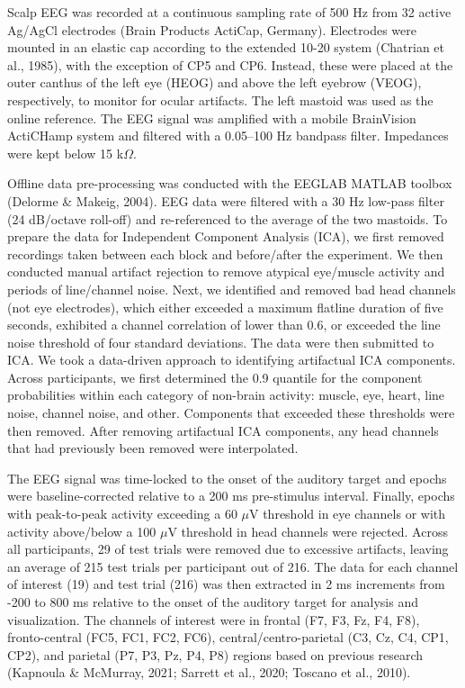 \documentclass[
  12pt,
  twoside]{article}
\begin{document}
Scalp EEG was recorded at a continuous sampling rate of 500 Hz from 32 active Ag/AgCl electrodes (Brain Products ActiCap, Germany).
Electrodes were mounted in an elastic cap according to the extended 10-20 system (Chatrian et al., 1985), with the exception of CP5 and CP6.
Instead, these were placed at the outer canthus of the left eye (HEOG) and above the left eyebrow (VEOG), respectively, to monitor for ocular artifacts.
The left mastoid was used as the online reference.
The EEG signal was amplified with a mobile BrainVision ActiCHamp system and filtered with a 0.05--100 Hz bandpass filter.
Impedances were kept below 15 k\(\Omega\).

Offline data pre-processing was conducted with the EEGLAB MATLAB toolbox (Delorme \& Makeig, 2004).
EEG data were filtered with a 30 Hz low-pass filter (24 dB/octave roll-off) and re-referenced to the average of the two mastoids.
To prepare the data for Independent Component Analysis (ICA), we first removed recordings taken between each block and before/after the experiment.
We then conducted manual artifact rejection to remove atypical eye/muscle activity and periods of line/channel noise.
Next, we identified and removed bad head channels (not eye electrodes), which either exceeded a maximum flatline duration of five seconds, exhibited a channel correlation of lower than 0.6, or exceeded the line noise threshold of four standard deviations.
The data were then submitted to ICA.
We took a data-driven approach to identifying artifactual ICA components.
Across participants, we first determined the 0.9 quantile for the component probabilities within each category of non-brain activity: muscle, eye, heart, line noise, channel noise, and other.
Components that exceeded these thresholds were then removed.
After removing artifactual ICA components, any head channels that had previously been removed were interpolated.

The EEG signal was time-locked to the onset of the auditory target and epochs were baseline-corrected relative to a 200 ms pre-stimulus interval.
Finally, epochs with peak-to-peak activity exceeding a 60 \(\mu\)V threshold in eye channels or with activity above/below a 100 \(\mu\)V threshold in head channels were rejected.
Across all participants, 29 of test trials were removed due to excessive artifacts, leaving an average of 215 test trials per participant out of 216.
The data for each channel of interest (19) and test trial (216) was then extracted in 2 ms increments from -200 to 800 ms relative to the onset of the auditory target for analysis and visualization.
The channels of interest were in frontal (F7, F3, Fz, F4, F8), fronto-central (FC5, FC1, FC2, FC6), central/centro-parietal (C3, Cz, C4, CP1, CP2), and parietal (P7, P3, Pz, P4, P8) regions based on previous research (Kapnoula \& McMurray, 2021; Sarrett et al., 2020; Toscano et al., 2010).
\end{document}
